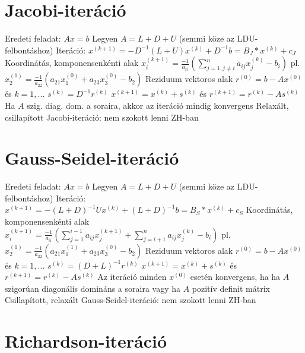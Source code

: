 \documentclass[12pt,a4paper]{article}
\begin{document}
\section{Jacobi-iteráció}

\begin{outline}
	\1 Eredeti feladat: $Ax=b$
	\1 Legyen $A = L+D+U$ (semmi köze az LDU-felbontáshoz)
	\1 Iteráció: $x^{(k+1)} = -D^{-1}(L+U)x^{(k)}+D^{-1}b = B_J * x^{(k)} + c_J$
	\1 Koordinátás, komponensenkénti alak
		\2 $x_i^{(k+1)} = \frac{-1}{a_{ii}} (\sum_{j=1,j \ne i}^{n} a_{ij} x_j^{(k)} - b_i)$
		\2 pl. $x_2^{(1)} = \frac{-1}{a_{22}} (a_{21}x_1^{(0)} + a_{23}x_3^{(0)} - b_2)$
	\1 Reziduum vektoros alak
		\2 $r^{(0)} = b - Ax^{(0)}$ és $k=1,...$
		\2 $s^{(k)} = D^{-1} r^{(k)}$
		\2 $x^{(k+1)} = x^{(k)} + s^{(k)}$ és $r^{(k+1)} = r^{(k)} - As^{(k)}$
	\1 Ha $A$ szig. diag. dom. a soraira, akkor az iteráció mindig konvergens
	\1 Relaxált, csillapított Jacobi-iteráció: nem szokott lenni ZH-ban
\end{outline}

\pagebreak

\section{Gauss-Seidel-iteráció}

\begin{outline}
	\1 Eredeti feladat: $Ax=b$
	\1 Legyen $A = L+D+U$ (semmi köze az LDU-felbontáshoz)
	\1 Iteráció: $x^{(k+1)} = -(L+D)^{-1}Ux^{(k)}+(L+D)^{-1}b = B_S * x^{(k)} + c_S$
	\1 Koordinátás, komponensenkénti alak
		\2 $x_i^{(k+1)} = \frac{-1}{a_{ii}} (
		\sum_{j=1}^{i-1} a_{ij} x_j^{(k+1)}
		+ \sum_{j=i+1}^{n} a_{ij} x_j^{(k)}
		- b_i)$
		\2 pl. $x_2^{(1)} = \frac{-1}{a_{22}} (a_{21}x_1^{(1)} + a_{23}x_3^{(0)} - b_2)$
	\1 Reziduum vektoros alak
		\2 $r^{(0)} = b - Ax^{(0)}$ és $k=1,...$
		\2 $s^{(k)} = (D+L)^{-1} r^{(k)}$
		\2 $x^{(k+1)} = x^{(k)} + s^{(k)}$ és $r^{(k+1)} = r^{(k)} - As^{(k)}$
	\1 Az iteráció minden $x^{(0)}$ esetén konvergens, ha
		\2 ha $A$ szigorúan diagonális domináns a soraira
		\2 vagy ha $A$ pozitív definit mátrix
	\1 Csillapított, relaxált Gauss-Seidel-iteráció: nem szokott lenni ZH-ban
\end{outline}

\pagebreak

\section{Richardson-iteráció}
\end{document}
